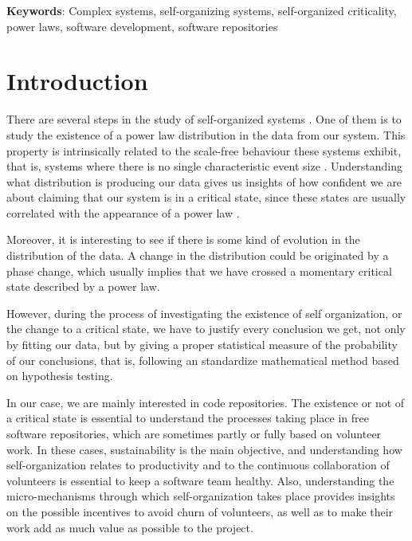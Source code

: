 \documentclass{article}
\begin{document}
\textbf{Keywords}: Complex systems, self-organizing systems, self-organized
  criticality, power laws, software development, software repositories



\section{Introduction}\label{introduction}

There are several steps in the study of self-organized systems
\cite{bak1988self}. One of them is to study the existence of a
power law distribution in the data from our system. This property is
intrinsically related to the scale-free behaviour these systems
exhibit, that is, systems where there is no single characteristic
event size \cite{golyk20self}.  Understanding what distribution is
producing our data gives us insights of how confident we are about
claiming that our system is in a critical state, since these states
are usually correlated with the appearance of a power law
\cite{newman2005power}.

Moreover, it is interesting to see if there is some kind of evolution
in the distribution of the data.  A change in the distribution
could be originated by a phase change, which usually implies that
we have crossed a momentary critical state described by a power law.

However, during the process of investigating the existence of self
organization, or the change to a critical state, we have to justify
every conclusion we get, not only by fitting our data, but by giving a
proper statistical measure of the probability of our conclusions, that
is, following an standardize mathematical method based on hypothesis
testing.

In our case, we are mainly interested in code repositories. The
existence or not of a critical state is essential to understand the
processes taking place in free software repositories, which are
sometimes partly or fully based on volunteer work. In these cases,
sustainability is the main objective, and understanding how
self-organization relates to productivity and to the continuous
collaboration of volunteers is essential to keep a software team
healthy. Also, understanding the micro-mechanisms through which
self-organization takes place provides insights on the possible
incentives to avoid churn of volunteers, as well as to make their work
add as much value as possible to the project.
\end{document}
